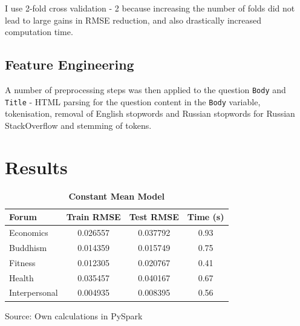\documentclass[11pt,preprint, authoryear]{article}
\numberwithin{equation}{section}
\numberwithin{figure}{section}
\begin{document}
I use 2-fold cross validation - 2 because increasing the number of folds
did not lead to large gains in RMSE reduction, and also drastically
increased computation time.

\subsection{Feature Engineering}\label{feature-engineering}

A number of preprocessing steps was then applied to the question
\texttt{Body} and \texttt{Title} - HTML parsing for the question content
in the \texttt{Body} variable, tokenisation, removal of English
stopwords and Russian stopwords for Russian StackOverflow and stemming
of tokens.

\section{\texorpdfstring{Results
\label{Results}}{Results }}\label{results}

\footnotesize

\begin{longtable}[htbp] {@{} lccc @{}} 
\caption{\textbf{Constant Mean Model}} 
\label{tab:mean_model} \\
\hline \hline
\textbf{Forum} &  \textbf{Train RMSE} &  \textbf{Test RMSE} &  \textbf{Time (s)} \\
\hline \hline
Economics     &              0.026557 &              0.037792 &                0.93 \\
Buddhism      &              0.014359 &              0.015749 &                0.75 \\
Fitness       &              0.012305 &              0.020767 &                0.41 \\
Health        &              0.035457 &              0.040167 &                0.67 \\
Interpersonal &              0.004935 &              0.008395 &                0.56 \\
\hline \hline
\end{longtable}\begin{center} Source: Own calculations in PySpark\end{center}

\normalsize

\footnotesize
\end{document}

